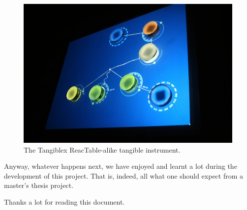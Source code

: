 \begin{figure}[h!]
  \centering
  \includegraphics[width=\textwidth]{pic/fidumusic.jpg}
  \caption{The Tangiblex ReacTable-alike tangible instrument.}
  \label{fig:tangiblex}
\end{figure}

Anyway, whatever happens next, we have enjoyed and learnt a lot during
the development of this project. That is, indeed, all what one should
expect from a master's thesis project.

Thanks a lot for reading this document.

